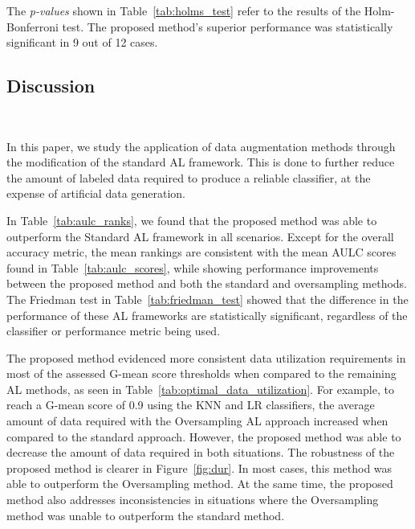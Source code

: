 \documentclass[parskip=full]{scrartcl}
\begin{document}
The \textit{p-values} shown in Table~\ref{tab:holms_test} refer to the results
of the Holm-Bonferroni test. The proposed method's superior performance was
statistically significant in 9 out of 12 cases. 

\begin{table}
	\centering
    \caption{%
        Adjusted p-values using the Holm-Bonferroni method. Bold values are
        statistically significant at a level of $\alpha = 0.05$. The null
        hypothesis is that the Oversampling or Proposed method does not
        perform better than the control method (Standard AL framework).
    }\label{tab:holms_test}
\end{table}

\subsection{Discussion}~\label{sec:sub_discussion}

In this paper, we study the application of data augmentation methods through
the modification of the standard AL framework. This is done to further reduce
the amount of labeled data required to produce a reliable classifier, at the
expense of artificial data generation.
 
In Table~\ref{tab:aulc_ranks}, we found that the proposed method was able to
outperform the Standard AL framework in all scenarios. Except for the overall
accuracy metric, the mean rankings are consistent with the mean AULC scores
found in Table~\ref{tab:aulc_scores}, while showing performance improvements
between the proposed method and both the standard and oversampling methods.
The Friedman test in Table~\ref{tab:friedman_test} showed that the difference
in the performance of these AL frameworks are statistically significant,
regardless of the classifier or performance metric being used.
 
The proposed method evidenced more consistent data utilization requirements in
most of the assessed G-mean score thresholds when compared to the remaining AL
methods, as seen in Table~\ref{tab:optimal_data_utilization}. For example, to
reach a G-mean score of 0.9 using the KNN and LR classifiers, the average
amount of data required with the Oversampling AL approach increased when
compared to the standard approach. However, the proposed method was able to
decrease the amount of data required in both situations. The robustness of the
proposed method is clearer in Figure~\ref{fig:dur}. In most cases, this method
was able to outperform the Oversampling method. At the same time, the proposed
method also addresses inconsistencies in situations where the Oversampling
method was unable to outperform the standard method.
\end{document}
